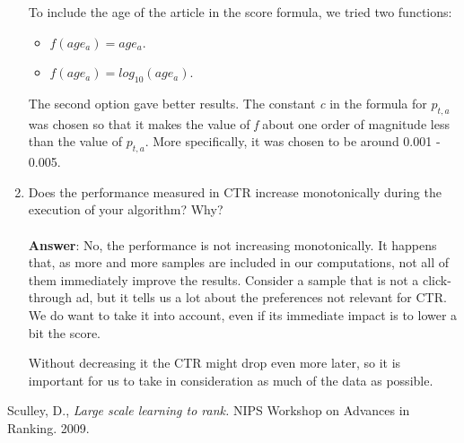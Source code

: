 \documentclass[11pt]{article}
\begin{document}
\begin{enumerate}
To include the age of the article in the score formula, we tried two functions: 
\begin{itemize}
    \item $f(age_a) = age_a$.
    \item $f(age_a) = log_{10}(age_a)$.
\end{itemize}

The second option gave better results. The constant \emph{c} in the formula for $p_{t,a}$
was chosen so that it makes the value of \emph{f} about one order of magnitude less than
the value of $p_{t,a}$. More specifically, it was chosen to be around 0.001 - 0.005.

\item Does the performance measured in CTR increase monotonically during the
execution of your algorithm? Why? \\ \\
\textbf{Answer}: No, the performance is not increasing monotonically.
It happens that, as more and more samples are included in our
computations, not all of them immediately improve the results.
Consider a sample that is not a click-through ad, but it tells us a lot
about the preferences not relevant for CTR. We do want to take it into
account, even if its immediate impact is to lower a bit the score.

Without decreasing it the CTR might drop even more later, so it is
important for us to take in consideration as much of the data as
possible.

\end{enumerate}


\begin{thebibliography}{100}

 Sculley, D., \emph{Large scale learning to rank.} 
NIPS Workshop on Advances in Ranking. 2009.

\end{thebibliography}
\end{document}

